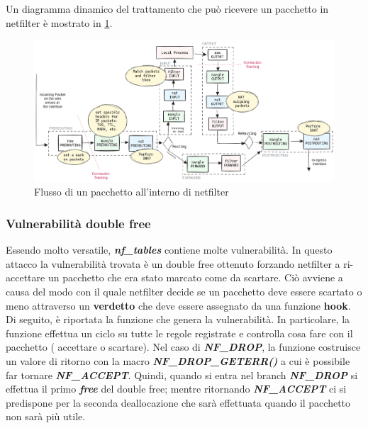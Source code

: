 \documentclass{article}
\begin{document}
Un diagramma dinamico del trattamento che può ricevere un pacchetto in netfilter è mostrato 
in \cref{fig:nf_flow}.

\begin{figure}[h]
  \begin{center}
    \includegraphics[width=.8\textwidth]{figures/ch1/Diagrama_linux_netfilter_iptables.png}
  \end{center}
  \caption{Flusso di un pacchetto all'interno di netfilter}\label{fig:nf_flow}
\end{figure}

\subsubsection{Vulnerabilità double free}\label{s:nf_tables-df}
Essendo molto versatile, \textbf{\textit{nf\_tables}} 
contiene molte vulnerabilità. In questo attacco la vulnerabilità trovata è un double free 
ottenuto forzando netfilter a ri-accettare un pacchetto che era stato marcato come da scartare. 
Ciò avviene a causa del modo con il quale netfilter decide se un pacchetto deve essere scartato o 
meno attraverso un \textbf{verdetto} che deve essere assegnato da una funzione \textbf{hook}. 
Di seguito, è riportata la funzione che genera la vulnerabilità. In particolare, la funzione 
effettua un ciclo su tutte le regole registrate e controlla cosa fare con il pacchetto (
accettare o scartare). Nel caso di \textbf{\textit{NF\_DROP}}, la funzione costruisce un 
valore di ritorno con la macro \textbf{\textit{NF\_DROP\_GETERR()}} a cui è possibile far 
tornare \textbf{\textit{NF\_ACCEPT}}. Quindi, quando si entra nel branch \textbf{\textit{NF\_DROP}}
si effettua il primo \textbf{\textit{free}} del double free; mentre ritornando \textbf{\textit{NF\_ACCEPT}}
ci si predispone per la seconda deallocazione che sarà effettuata quando il pacchetto non 
sarà più utile.
\end{document}
